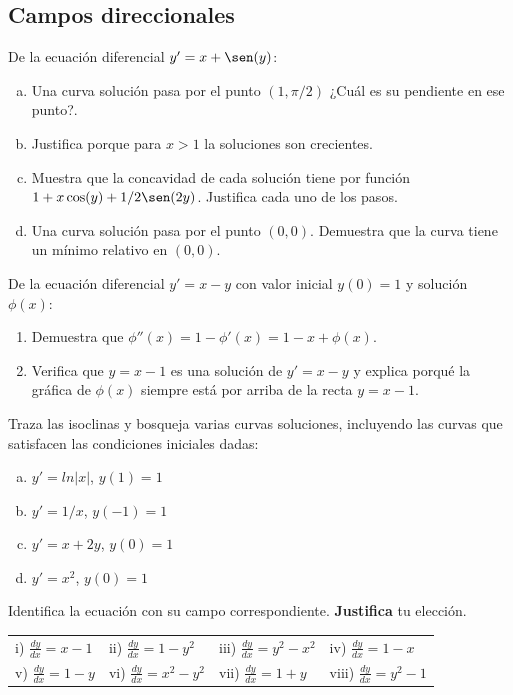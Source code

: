 \documentclass[12pt]{exam}
\begin{document}
    
    \begin{questions}
    
     \section{Campos direccionales}
    
     \question
     De la ecuación diferencial $y'=x+\sen(y)$:
     \begin{enumerate}[a)]
         \item Una curva solución pasa por el punto $(1,\pi/2)$ ¿Cuál es su pendiente en ese punto?.
         \item Justifica porque para $x>1$ la soluciones son crecientes.
         \item Muestra que la concavidad de cada solución tiene por función $1+x\cos(y)+1/2\sen(2y)$. Justifica cada uno de los pasos.
         \item Una curva solución pasa por el punto $(0,0)$. Demuestra que la curva tiene un mínimo relativo en $(0,0)$.
     \end{enumerate}
    
     \question
     De la ecuación diferencial $y'=x-y$ con valor inicial $y(0)=1$ y solución $\phi(x)$:
     \begin{enumerate}
         \item Demuestra que $\phi''(x)=1-\phi'(x)=1-x+\phi(x)$.
         \item Verifica que $y=x-1$ es una solución de $y'=x-y$ y explica porqué la gráfica de $\phi(x)$ siempre está por arriba de la recta $y=x-1$.
     \end{enumerate}
     
     \question
     Traza las isoclinas y bosqueja varias curvas soluciones, incluyendo las curvas que satisfacen las condiciones iniciales dadas:
     \begin{enumerate}[a)]
         \item  $y'=ln|x|$, $y(1)=1$
         \item  $y'=1/x$, $y(-1)=1$
         \item  $y'=x+2y$, $y(0)=1$
         \item  $y'=x^2$, $y(0)=1$
     \end{enumerate}
        
     \question
     Identifica la ecuación con su campo correspondiente. \textbf{Justifica} tu elección.
     
     \begin{tabular}{llll}
       i) $\frac{dy}{dx}=x-1$   & ii) $\frac{dy}{dx}=1-y^2$ & iii) $\frac{dy}{dx}=y^2-x^2$ & iv) $\frac{dy}{dx}=1-x$ \\
         v) $\frac{dy}{dx}=1-y$ & vi) $\frac{dy}{dx}=x^2-y^2$ & vii) $\frac{dy}{dx}=1+y$ & viii) $\frac{dy}{dx}=y^2-1$
     \end{tabular}
     

\end{questions}
\end{document}
